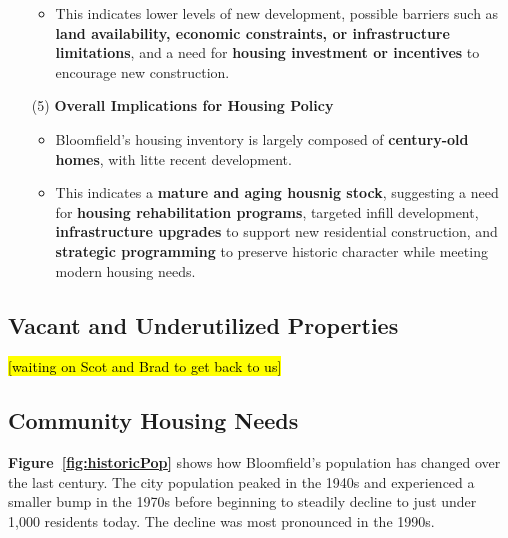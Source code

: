 \begin{itemize}
\begin{itemize}
        \item This indicates lower levels of new development, possible barriers such as \textbf{land availability, economic constraints, or infrastructure limitations}, and a need for \textbf{housing investment or incentives} to encourage new construction.
    \end{itemize}
    \item [(5)] \textbf{\textcolor{coBalt}{Overall Implications for Housing Policy}}
    \begin{itemize}
        \item Bloomfield's housing inventory is largely composed of \textbf{century-old homes}, with litte recent development.
        \item This indicates a \textbf{mature and aging housnig stock}, suggesting a need for \textbf{housing rehabilitation programs}, targeted infill development, \textbf{infrastructure upgrades} to support new residential construction, and \textbf{strategic programming} to preserve historic character while meeting modern housing needs.
    \end{itemize}
\end{itemize}


\newpage
\thispagestyle{empty}
\begin{landscape}
    
\end{landscape}
\newpage

\pagebreak
\subsection{Vacant and Underutilized Properties}
\noindent \hl{[waiting on Scot and Brad to get back to us]}

\pagebreak
\subsection{Community Housing Needs}


\noindent \textbf{Figure~\ref{fig:historicPop}} shows how Bloomfield's population has changed over the last century. The city population peaked in the 1940s and experienced a smaller bump in the 1970s before beginning to steadily decline to just under 1,000 residents today. The decline was most pronounced in the 1990s.

